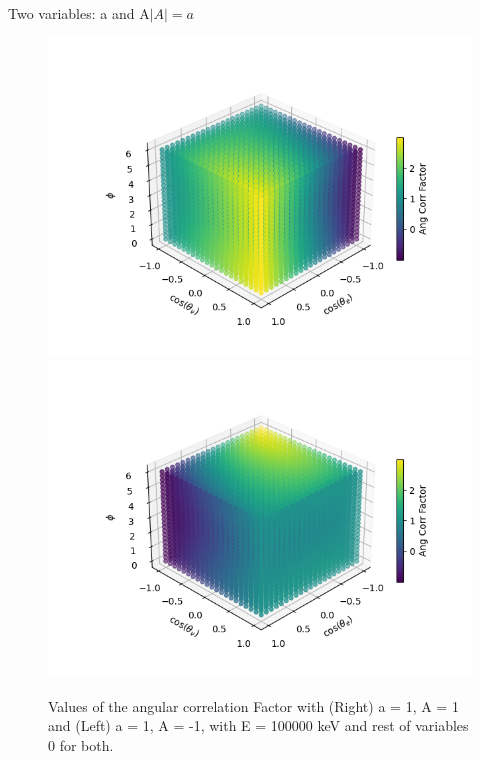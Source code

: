 \documentclass{beamer}
\begin{document}
\begin{frame}{Two variables: a and A}{$|A|= a$}
	\begin{figure}
		\centering
		\includegraphics[width=0.4\paperwidth]{plots/posa_eqposA_3D}
		\includegraphics[width=0.4\paperwidth]{plots/posa_eqnegA_3D}
		\caption{Values of the angular correlation Factor with (Right) a = 1, A = 1 and (Left) a = 1, A = -1, with E = 100000 keV and rest of variables 0 for both.}
	\end{figure}
\end{frame}
\end{document}
